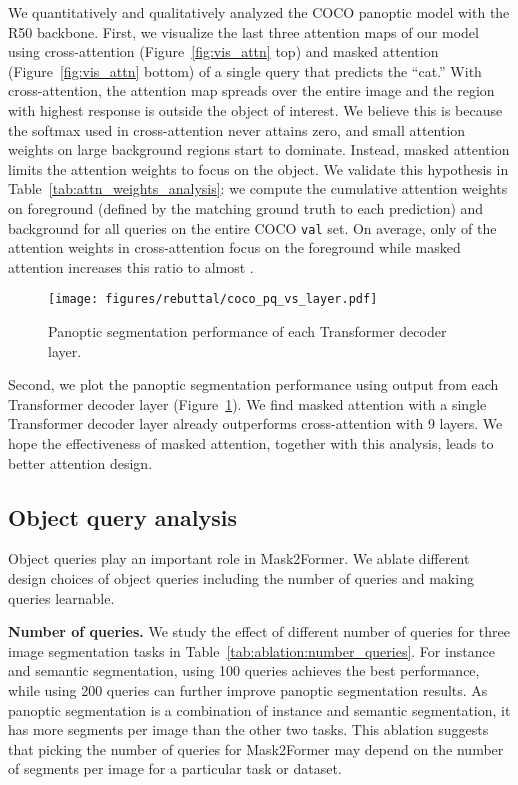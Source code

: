 \documentclass[10pt,twocolumn,letterpaper]{article}
\newcommand{\modelname}{Mask2Former\xspace}
\newcommand{\figref}[1]{Figure~\ref{#1}}
\newcommand{\tabref}[1]{Table~\ref{#1}}
\begin{document}
We quantitatively and qualitatively analyzed the COCO panoptic model with the R50 backbone. First, we visualize the last three attention maps of our model using cross-attention (\figref{fig:vis_attn} top) and masked attention (\figref{fig:vis_attn} bottom) of a single query that predicts the ``cat.'' 
With cross-attention, the attention map spreads over the entire image and the region with highest response is outside the object of interest.
We believe this is because the softmax used in cross-attention never attains zero, and small attention weights on large background regions start to dominate.
Instead, masked attention limits the attention weights to focus on the object.
We validate this hypothesis in \tabref{tab:attn_weights_analysis}: we compute the cumulative attention weights on foreground (defined by the matching ground truth to each prediction) and background for all queries on the entire COCO \texttt{val} set.
On average, only  of the attention weights in cross-attention focus on the foreground while masked attention increases this ratio to almost .
\begin{figure}[t!]
    \centering
        \texttt{[image: figures/rebuttal/coco\_pq\_vs\_layer.pdf]}

    \caption{Panoptic segmentation performance of each Transformer decoder layer.}
    \label{fig:pq_vs_layer}
\end{figure}
Second, we plot the panoptic segmentation performance
using output from each Transformer decoder layer (\figref{fig:pq_vs_layer}). We find masked attention with a single Transformer decoder layer already outperforms cross-attention with 9 layers.
We hope the effectiveness of masked attention, together with this analysis, leads to better attention design.

\subsection{Object query analysis}
Object queries play an important role in \modelname. We ablate different design choices of object queries including the number of queries and making queries learnable.

\noindent\textbf{Number of queries.}
We study the effect of different number of queries for three image segmentation tasks in \tabref{tab:ablation:number_queries}. For instance and semantic segmentation, using 100 queries achieves the best performance, while using 200 queries can further improve panoptic segmentation results. As panoptic segmentation is a combination of instance and semantic segmentation, it has more segments per image than the other two tasks. This ablation suggests that picking the number of queries for \modelname may depend on the number of segments per image for a particular task or dataset.
\end{document}
